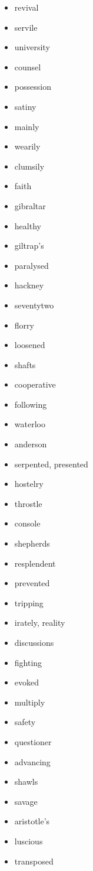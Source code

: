 \documentclass{article}
\begin{document}
\begin{itemize}
    \item revival
    \item servile
    \item university
    \item counsel
    \item possession
    \item satiny
    \item mainly
    \item wearily
    \item clumsily
    \item faith
    \item gibraltar
    \item healthy
    \item giltrap's
    \item paralysed
    \item hackney
    \item seventytwo
    \item florry
    \item loosened
    \item shafts
    \item cooperative
    \item following
    \item waterloo
    \item anderson
    \item serpented, presented
    \item hostelry
    \item throstle
    \item console
    \item shepherds
    \item resplendent
    \item prevented
    \item tripping
    \item irately, reality
    \item discussions
    \item fighting
    \item evoked
    \item multiply
    \item safety
    \item questioner
    \item advancing
    \item shawls
    \item savage
    \item aristotle's
    \item luscious
    \item transposed

\end{itemize}
\end{document}
